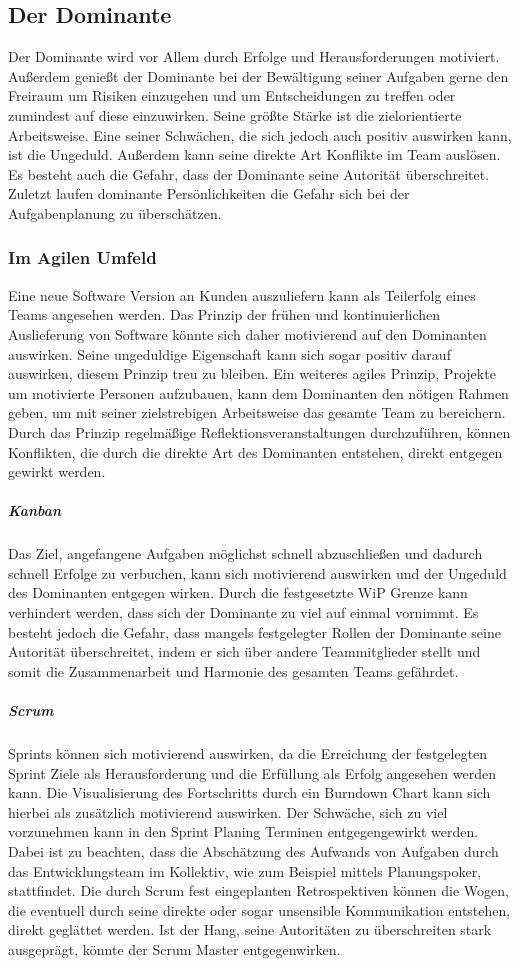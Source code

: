 \documentclass[twocolumn,10pt]{asme2ej}
\begin{document}
\subsection{Der Dominante}
Der Dominante  wird vor Allem durch Erfolge und Herausforderungen motiviert. Außerdem genießt der Dominante bei der Bewältigung seiner Aufgaben gerne den Freiraum um Risiken einzugehen und um Entscheidungen zu treffen oder zumindest auf diese einzuwirken. Seine größte Stärke ist die zielorientierte Arbeitsweise. Eine seiner Schwächen, die sich jedoch auch positiv auswirken kann, ist die Ungeduld. Außerdem kann seine direkte Art Konflikte im Team auslösen. Es besteht auch die Gefahr, dass der Dominante seine Autorität überschreitet. Zuletzt laufen dominante Persönlichkeiten die Gefahr sich bei der Aufgabenplanung zu überschätzen.

\subsubsection{Im Agilen Umfeld}
Eine neue Software Version an Kunden auszuliefern kann als Teilerfolg eines Teams angesehen werden. Das Prinzip der frühen und kontinuierlichen Auslieferung von Software könnte sich daher motivierend auf den Dominanten auswirken. Seine ungeduldige Eigenschaft kann sich sogar positiv darauf auswirken, diesem Prinzip treu zu bleiben. Ein weiteres agiles Prinzip, Projekte um motivierte Personen aufzubauen, kann dem Dominanten den nötigen Rahmen geben, um mit seiner zielstrebigen Arbeitsweise das gesamte Team zu bereichern. Durch das Prinzip regelmäßige Reflektionsveranstaltungen durchzuführen, können Konflikten, die durch die direkte Art des Dominanten entstehen, direkt entgegen gewirkt werden.

\subparagraph{Kanban} Das Ziel, angefangene Aufgaben möglichst schnell abzuschließen und dadurch schnell Erfolge zu verbuchen, kann sich motivierend auswirken und der Ungeduld des Dominanten entgegen wirken. Durch die festgesetzte WiP Grenze kann verhindert werden, dass sich der Dominante zu viel auf einmal vornimmt. Es besteht jedoch die Gefahr, dass mangels festgelegter Rollen der Dominante seine Autorität überschreitet, indem er sich über andere Teammitglieder stellt und somit die Zusammenarbeit und Harmonie des gesamten Teams gefährdet.

\subparagraph{Scrum} Sprints können sich motivierend auswirken, da die Erreichung der festgelegten Sprint Ziele als Herausforderung und die Erfüllung als Erfolg angesehen werden kann. Die Visualisierung des Fortschritts durch ein Burndown Chart kann sich hierbei als zusätzlich motivierend auswirken. Der Schwäche, sich zu viel vorzunehmen kann in den Sprint Planing Terminen entgegengewirkt werden. Dabei ist zu beachten, dass die Abschätzung des Aufwands von Aufgaben durch das Entwicklungsteam im Kollektiv, wie zum Beispiel mittels Planungspoker, stattfindet. Die durch Scrum fest eingeplanten Retrospektiven können die Wogen, die eventuell durch seine direkte oder sogar unsensible Kommunikation entstehen, direkt geglättet werden. Ist der Hang, seine Autoritäten zu überschreiten stark ausgeprägt, könnte der Scrum Master entgegenwirken.
\end{document}
